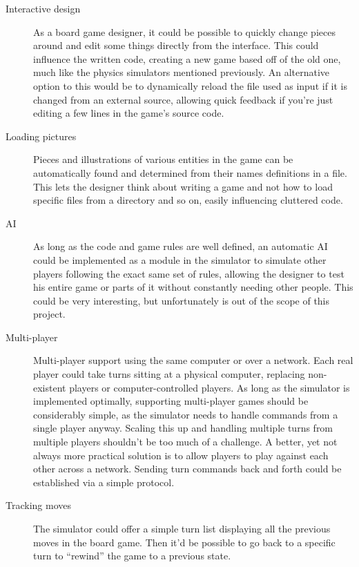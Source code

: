 \begin{description}

  \item[Interactive design] As a board game designer, it could be possible to
    quickly change pieces around and edit some things directly from the
    interface. This could influence the written code, creating a new game based
    off of the old one, much like the physics simulators mentioned previously.
    An alternative option to this would be to dynamically reload the file used
    as input if it is changed from an external source, allowing quick feedback
    if you're just editing a few lines in the game's source code.

  \item[Loading pictures] Pieces and illustrations of various entities in the
    game can be automatically found and determined from their names definitions
    in a \productname{} file. This lets the designer think about writing a game
    and not how to load specific files from a directory and so on, easily
    influencing cluttered code.

  \item[AI] As long as the code and game rules are well defined, an automatic AI
    could be implemented as a module in the simulator to simulate other players
    following the exact same set of rules, allowing the designer to test his
    entire game or parts of it without constantly needing other people. This
    could be very interesting, but unfortunately is out of the scope of this
    project.

  \item[Multi-player] Multi-player support using the same computer or over a
    network. Each real player could take turns sitting at a physical computer,
    replacing non-existent players or computer-controlled players. As long as
    the simulator is implemented optimally, supporting multi-player games should
    be considerably simple, as the simulator needs to handle commands from a
    single player anyway. Scaling this up and handling multiple turns from
    multiple players shouldn't be too much of a challenge. A better, yet not
    always more practical solution is to allow players to play against each
    other across a network. Sending turn commands back and forth could be
    established via a simple protocol.

  \item[Tracking moves] The simulator could offer a simple turn list displaying
    all the previous moves in the board game. Then it'd be possible to go back
    to a specific turn to ``rewind'' the game to a previous state.
\end{description}


